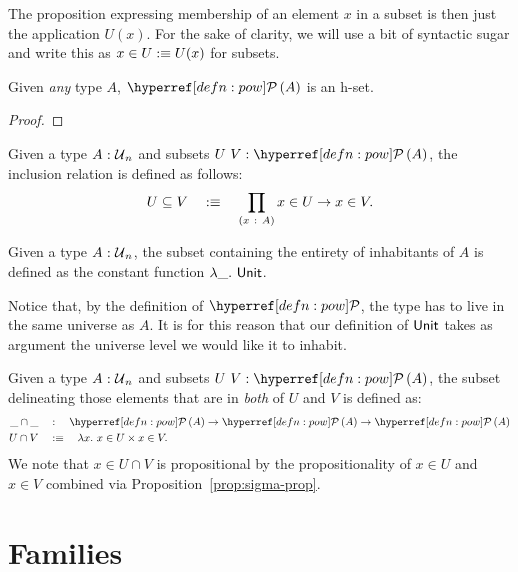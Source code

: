The proposition expressing membership of an element $x$ in a subset is then just the
application $U(x)$. For the sake of clarity, we will use a bit of syntactic sugar and
write this as $x \in U :\equiv U(x)$ for subsets.

\begin{prop}\label{prop:pow-set}
  Given \emph{any} type $A$, $\pow{A}$ is an h-set.
\end{prop}
\begin{proof}
\end{proof}

\begin{defn}\label{defn:inclusion}
  Given a type $A\hspace{0.1mm}:\hspace{0.1mm}\mathcal{U}{}_n$ and subsets $\oftyII{U}{V}{\pow{A}}$, the inclusion
  relation is defined as follows:
  \begin{equation*}
    U \subseteq V \quad:\equiv\quad \prod_{(x~:~A)} x \in U \rightarrow x \in V.
  \end{equation*}
\end{defn}

\begin{defn}\label{defn:entire-subset}
  Given a type $A\hspace{0.1mm}:\hspace{0.1mm}\mathcal{U}{}_n$, the subset containing the entirety of inhabitants
  of $A$ is defined as the constant function $\lambda\_.~\mathsf{Unit}{}$.

  Notice that, by the definition of $\pownm{}$, the type has to live in the same universe
  as $A$. It is for this reason that our definition of $\mathsf{Unit}{}$ takes as argument
  the universe level we would like it to inhabit.
\end{defn}

\begin{defn}\label{defn:intersection}
  Given a type $A\hspace{0.1mm}:\hspace{0.1mm}\mathcal{U}{}_n$ and subsets $\oftyII{U}{V}{\pow{A}}$, the subset
  delineating those elements that are in \emph{both} of $U$ and $V$ is defined as:
  \begin{align*}
    \_\cap\_  \quad&:\quad   \pow{A} \rightarrow \pow{A} \rightarrow \pow{A} \\
    U \cap V  \quad&\is\quad \lambda x.~ x \in U \times x \in V  .
  \end{align*}
  We note that $x \in U \cap V$ is propositional by the propositionality of $x \in U$ and $x \in V$
  combined via Proposition~\ref{prop:sigma-prop}.
\end{defn}

\section{Families}

